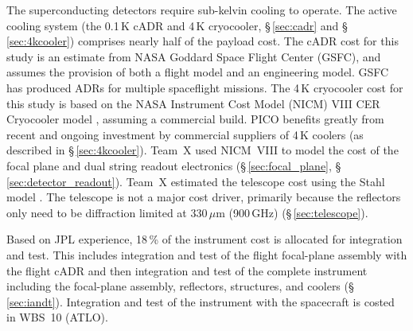 %
\costfootnote

The superconducting detectors require sub-kelvin cooling to
operate. The active cooling system (the 0.1\,K cADR and 4\,K
cryocooler, \S\,\ref{sec:cadr} and \S\,\ref{sec:4kcooler}) comprises nearly half of the payload
cost. The cADR cost for this study is an estimate from NASA Goddard
Space Flight Center (GSFC), and assumes the provision of both a flight
model and an engineering model. GSFC has produced ADRs for multiple
spaceflight missions. The 4\,K cryocooler cost for this study is based
on the NASA Instrument Cost Model (NICM) VIII CER Cryocooler model
\cite{Mrozinski2017}, assuming a commercial build. PICO benefits
greatly from recent and ongoing investment by commercial suppliers of
4\,K coolers (as described in \S\,\ref{sec:4kcooler}).  Team~X used NICM~VIII to model
the cost of the focal plane and dual string readout electronics (\S\,\ref{sec:focal_plane},
\S\,\ref{sec:detector_readout}).  Team~X estimated the telescope cost using the Stahl model
\cite{Stahl2016}. The telescope is not a major cost driver, primarily
because the reflectors only need to be diffraction limited at 330\,$\mu$m
(900\,GHz) (\S\,\ref{sec:telescope}).

Based on JPL experience, 18\,\% of the instrument cost is allocated
for integration and test. This includes integration and test of the
flight focal-plane assembly with the flight cADR and then integration
and test of the complete instrument including the focal-plane
assembly, reflectors, structures, and coolers (\S\,\ref{sec:iandt}). Integration and
test of the instrument with the spacecraft is costed in WBS~10
(ATLO).
\costfootnote

